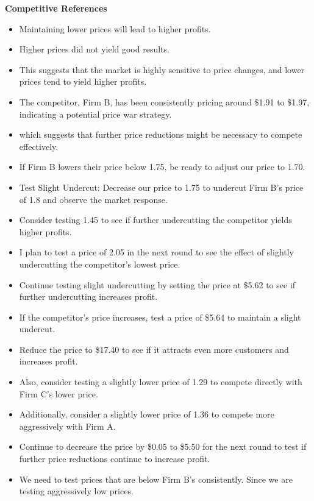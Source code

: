 \textbf{Competitive References}
\begin{itemize}
    \item Maintaining lower prices will lead to higher profits.
    \item Higher prices did not yield good results.
    \item This suggests that the market is highly sensitive to price changes, and lower prices tend to yield higher profits.
    \item The competitor, Firm B, has been consistently pricing around \$1.91 to \$1.97, indicating a potential price war strategy.
    \item which suggests that further price reductions might be necessary to compete effectively.
    \item If Firm B lowers their price below 1.75, be ready to adjust our price to 1.70.
    \item Test Slight Undercut: Decrease our price to 1.75 to undercut Firm B's price of 1.8 and observe the market response.
    \item Consider testing 1.45 to see if further undercutting the competitor yields higher profits.
    \item I plan to test a price of 2.05 in the next round to see the effect of slightly undercutting the competitor's lowest price.
    \item Continue testing slight undercutting by setting the price at \$5.62 to see if further undercutting increases profit.
    \item If the competitor's price increases, test a price of \$5.64 to maintain a slight undercut.
    \item Reduce the price to \$17.40 to see if it attracts even more customers and increases profit.
    \item Also, consider testing a slightly lower price of 1.29 to compete directly with Firm C's lower price.
    \item Additionally, consider a slightly lower price of 1.36 to compete more aggressively with Firm A.
    \item Continue to decrease the price by \$0.05 to \$5.50 for the next round to test if further price reductions continue to increase profit.
    \item We need to test prices that are below Firm B's consistently. Since we are testing aggressively low prices.
\end{itemize}

